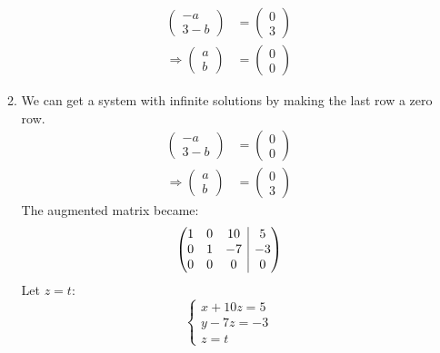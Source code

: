 \documentclass{article}
\makeatletter
\newenvironment{amatrix}[1]{%
  \left(\begin{array}{@{}*{#1}{c}|c@{}}
}{%
  \end{array}\right)
}
\makeatother
\begin{document}
\begin{enumerate}
\begin{enumerate}[label={(\roman*)}]
      \begin{align*}
        \begin{pmatrix}
          -a \\ 3 - b
        \end{pmatrix}
        &= 
        \begin{pmatrix}
          0 \\ 3
        \end{pmatrix}
        \\
        \Rightarrow
        \begin{pmatrix}
          a \\ b
        \end{pmatrix}
        &= 
        \begin{pmatrix}
          0 \\ 0
        \end{pmatrix}
      \end{align*}
    \item We can get a system with infinite solutions by making the last row a zero row.
      \begin{align*}
        \begin{pmatrix}
          -a \\ 3 - b
        \end{pmatrix}
        &= 
        \begin{pmatrix}
          0 \\ 0
        \end{pmatrix}
        \\
        \Rightarrow
        \begin{pmatrix}
          a \\ b
        \end{pmatrix}
        &= 
        \begin{pmatrix}
          0 \\ 3
        \end{pmatrix}
      \end{align*}
      The augmented matrix became:
      \[
        \begin{amatrix}{3}
          1 & 0 & 10 & 5 \\
          0 & 1 & -7 & -3 \\
          0 & 0 & 0 & 0 
        \end{amatrix}
      \]
      Let $z = t$:
      \[
        \begin{cases}
          x + 10z = 5 \\
          y - 7z = -3 \\
          z = t

\end{cases}\]
\end{enumerate}
\end{enumerate}
\end{document}
